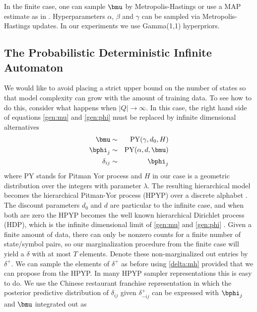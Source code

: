 In the finite case, one can sample $\bmu$ by Metropolis-Hastings or use a MAP estimate as in \cite{Mackay1995}.  Hyperparameters $\alpha$, $\beta$ and $\gamma$ can be sampled via Metropolis-Hastings updates.  In our experiments we use Gamma(1,1) hyperpriors.
 
 \subsection{The Probabilistic Deterministic Infinite Automaton}
 
We would like to avoid placing a strict upper bound on the number of states so that model complexity can grow with the amount of training data.  To see how to do this, consider what happens when $|Q|\rightarrow\infty$.   In this case, the right hand side of equations \eqref{gen:mu} and \eqref{gen:phi} must be replaced by infinite dimensional alternatives
%
\begin{eqnarray*}
\bmu &\sim& \mathrm{PY}(\gamma,d_0,H)\\
\bphi_j &\sim& \mathrm{PY}(\alpha, d, \bmu) \\
\delta_{ij} &\sim& \bphi_j
\end{eqnarray*}
%  
where $\mathrm{PY}$ stands for Pitman Yor process and $H$ in our case is a geometric distribution over the integers with parameter $\lambda$.   The resulting hierarchical model becomes the hierarchical Pitman-Yor process (HPYP) over a discrete alphabet \cite{Teh2006a}.  The discount parameters $d_0$ and $d$ are particular to the infinite case, and when both are zero the HPYP becomes the well known hierarchical Dirichlet process (HDP), which is the infinite dimensional limit of \eqref{gen:mu} and \eqref{gen:phi} \cite{Teh2006b}.
Given a finite amount of data, there can only be nonzero counts for a finite number of state/symbol pairs, so our marginalization procedure from the finite case will yield a $\delta$ with at most $T$ elements.  Denote these non-marginalized out entries by $\delta^+$.  We can sample the elements of $\delta^+$ as before using \eqref{delta:mh} provided that we can propose from the HPYP.  In many HPYP sampler representations this is easy to do.  We use the Chinese restaurant franchise representation \cite{Teh2006b} in which the posterior predictive distribution of $\delta_{ij}$ given $\delta_{-ij}^+$ can be expressed with $\bphi_j$ and $\bmu$ integrated out as
